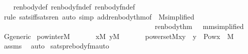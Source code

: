 \begin{isabellebody}
%
\isadelimproof
\ \ %
\endisadelimproof
%
\isatagproof
{}\isamarkupfalse%
\ renbody{\isacharunderscore}{\kern0pt}def\ renbody{\isacharunderscore}{\kern0pt}fn{\isacharunderscore}{\kern0pt}def\ renbody{}{\isacharunderscore}{\kern0pt}fn{\isacharunderscore}{\kern0pt}def\isanewline
\ \ \isamarkupfalse%
\ {\isacharparenleft}{\kern0pt}rule\ sats{\isacharunderscore}{\kern0pt}iff{\isacharunderscore}{\kern0pt}sats{\isacharunderscore}{\kern0pt}ren{\isacharcomma}{\kern0pt}\ auto\ simp\ add{\isacharcolon}{\kern0pt}renbody{}{\isacharunderscore}{\kern0pt}thm{\isacharparenleft}{\kern0pt}{}{\isacharparenright}{\kern0pt}{\isacharbrackleft}{\kern0pt}of\ {\isacharunderscore}{\kern0pt}\ M{\isacharcomma}{\kern0pt}simplified{\isacharbrackright}{\kern0pt}\isanewline
\ \ \ \ \ \ \ \ \ \ \ \ \ \ \ \ \ \ \ \ \ \ \ \ \ \ \ \ \ \ \ \ \ \ \ \ \ \ \ \ \ \ \ \ renbody{}{\isacharunderscore}{\kern0pt}thm{\isacharparenleft}{\kern0pt}{}{\isacharparenright}{\kern0pt}{\isacharbrackleft}{\kern0pt}\ {\isasymalpha}{\isacharequal}{\kern0pt}{\isasymalpha}\ \ m{\isacharequal}{\kern0pt}m{\isacharcomma}{\kern0pt}simplified{\isacharbrackright}{\kern0pt}{\isacharparenright}{\kern0pt}%
\endisatagproof
{\isafoldproof}%
%
\isadelimproof
\isanewline
%
\endisadelimproof
\isanewline
{}\isamarkupfalse%
\ G{\isacharunderscore}{\kern0pt}generic\isanewline
{}\isanewline
\isanewline
{}\isamarkupfalse%
\ pow{\isacharunderscore}{\kern0pt}inter{\isacharunderscore}{\kern0pt}M{\isacharcolon}{\kern0pt}\isanewline
\ \ \isanewline
\ \ \ \ {\isachardoublequoteopen}x{\isasymin}M{\isachardoublequoteclose}\ {\isachardoublequoteopen}y{\isasymin}M{\isachardoublequoteclose}\isanewline
\ \ \isanewline
\ \ \ \ {\isachardoublequoteopen}powerset{\isacharparenleft}{\kern0pt}{\isacharhash}{\kern0pt}{\isacharhash}{\kern0pt}M{\isacharcomma}{\kern0pt}x{\isacharcomma}{\kern0pt}y{\isacharparenright}{\kern0pt}\ {\isasymlongleftrightarrow}\ y\ {\isacharequal}{\kern0pt}\ Pow{\isacharparenleft}{\kern0pt}x{\isacharparenright}{\kern0pt}\ {\isasyminter}\ M{\isachardoublequoteclose}\isanewline
%
\isadelimproof
\ \ %
\endisadelimproof
%
\isatagproof
{}\isamarkupfalse%
\ assms\ \isamarkupfalse%
\ auto%
\endisatagproof
{\isafoldproof}%
%
\isadelimproof
\isanewline
%
\endisadelimproof
\isanewline
\isanewline
{}\isamarkupfalse%
\ sats{\isacharunderscore}{\kern0pt}prebody{\isacharunderscore}{\kern0pt}fm{\isacharunderscore}{\kern0pt}auto{\isacharcolon}{\kern0pt}\isanewline

\end{isabellebody}
